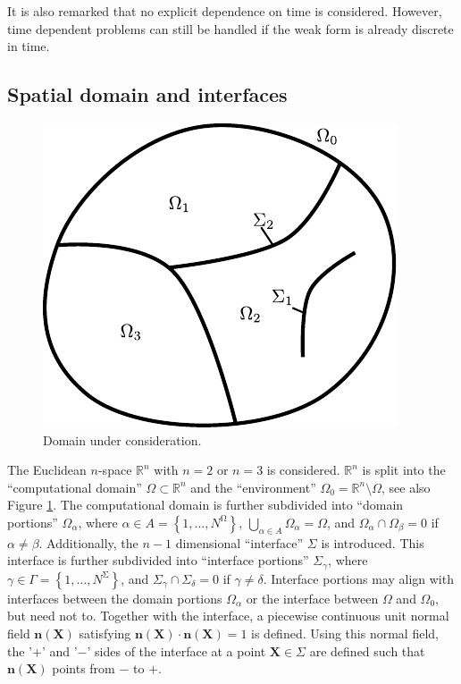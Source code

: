 \documentclass[pdftex,a4paper,12pt,abstracton]{scrartcl}
\begin{document}
It is also remarked that no explicit dependence on time is considered. However, time dependent problems can still be handled if the weak form is already discrete in time.

\subsection{Spatial domain and interfaces}
\begin{figure}[htb]
\centering
\includegraphics[scale=1.0]{graphics/domain.pdf}
\caption{Domain under consideration.}
\label{domain}
\end{figure}
The Euclidean $n$-space $\mathbb{R}^n$ with $n=2$ or $n=3$ is considered. $\mathbb{R}^n$ is split into the ``computational domain'' $\Omega \subset \mathbb{R}^n$ and the ``environment'' $\Omega_0 = \mathbb{R}^n \setminus \Omega$, see also Figure \ref{domain}. The computational domain is further subdivided into ``domain portions'' $\Omega_\alpha$, where $\alpha \in A=\left\{1, \hdots, N^\mathrm{\Omega}\right\}$, $\bigcup_{\alpha \in A} \Omega_\alpha = \Omega$, and $\Omega_\alpha \cap \Omega_\beta = 0$ if $\alpha\neq \beta$. Additionally, the $n-1$ dimensional ``interface'' $\Sigma$ is introduced. This interface is further subdivided into ``interface portions'' $\Sigma_\gamma$, where $\gamma \in \Gamma=\left\{1, \hdots, N^\mathrm{\Sigma}\right\}$, and $\Sigma_\gamma \cap \Sigma_\delta = 0$ if $\gamma\neq \delta$. Interface portions may align with interfaces between the domain portions $\Omega_\alpha$ or the interface between $\Omega$ and $\Omega_0$, but need not to. Together with the interface, a piecewise continuous unit normal field $\boldsymbol{n}(\boldsymbol{X})$ satisfying $\boldsymbol{n}(\boldsymbol{X})\cdot\boldsymbol{n}(\boldsymbol{X}) = 1$ is defined. Using this normal field, the '$+$' and '$-$' sides of the interface at a point $\boldsymbol{X} \in \Sigma$ are defined such that $\boldsymbol{n}(\boldsymbol{X})$ points from $-$ to $+$.
\end{document}
